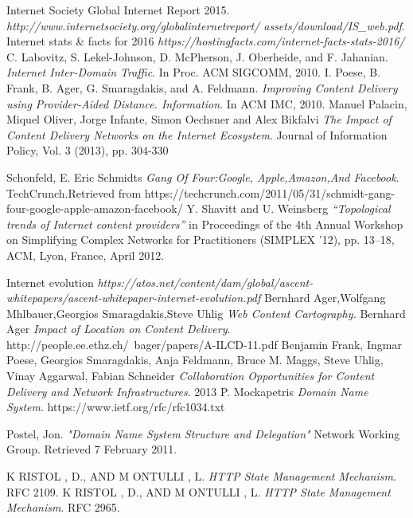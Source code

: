 \begin{thebibliography}{}
Internet Society Global Internet Report 2015.
\textit{http://www.internetsociety.org/globalinternetreport/
assets/download/IS\_web.pdf}.
Internet stats \& facts for 2016
\textit{https://hostingfacts.com/internet-facts-stats-2016/}
C. Labovitz, S. Lekel-Johnson, D. McPherson, J. Oberheide, and F. Jahanian. 
\textit{Internet Inter-Domain Traffic}.
In Proc. ACM SIGCOMM, 2010.
I. Poese, B. Frank, B. Ager, G. Smaragdakis, and A. Feldmann.
\textit{Improving Content Delivery using Provider-Aided Distance. Information}. 
In ACM IMC, 2010.
Manuel Palacin, Miquel Oliver, Jorge Infante, Simon Oechsner and Alex
Bikfalvi 
\textit{The Impact of Content Delivery Networks on the Internet Ecosystem}.
Journal of Information Policy, Vol. 3 (2013), pp. 304-330

Schonfeld, E. Eric Schmidts 
\textit{Gang Of Four:Google, Apple,Amazon,And Facebook}.
TechCrunch.Retrieved from https://techcrunch.com/2011/05/31/schmidt-gang-four-google-apple-amazon-facebook/
Y. Shavitt and U. Weinsberg
\textit{“Topological trends of Internet content providers”}
in Proceedings of the 4th Annual Workshop
on Simplifying Complex Networks for Practitioners (SIMPLEX
’12), pp. 13–18, ACM, Lyon, France, April 2012.

Internet evolution
\textit{https://atos.net/content/dam/global/ascent-whitepapers/ascent-whitepaper-internet-evolution.pdf}
Bernhard Ager,Wolfgang Mhlbauer,Georgios Smaragdakis,Steve Uhlig
\textit{Web Content Cartography.}
Bernhard Ager 
\textit{Impact of Location on Content Delivery}.
http://people.ee.ethz.ch/~bager/papers/A-ILCD-11.pdf
Benjamin Frank, Ingmar Poese, Georgios Smaragdakis,
Anja Feldmann, Bruce M. Maggs, Steve Uhlig,
Vinay Aggarwal, Fabian Schneider
\textit{Collaboration Opportunities for
Content Delivery and Network Infrastructures}.
2013
P. Mockapetris
\textit{Domain Name System}.
https://www.ietf.org/rfc/rfc1034.txt

 Postel, Jon. 
 \textit{"Domain Name System Structure and Delegation"}
Network Working Group. Retrieved 7 February 2011.

K RISTOL , D., AND M ONTULLI , L. 
\textit{HTTP State Management Mechanism}.
RFC 2109.
K RISTOL , D., AND M ONTULLI , L.
\textit{HTTP State Management Mechanism}.
RFC 2965.


\end{thebibliography}
